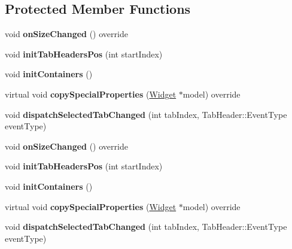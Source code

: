 \subsection*{Protected Member Functions}
\begin{DoxyCompactItemize}
\item 
\mbox{\label{classui_1_1TabControl_af998922d3b0c715156885b983e30d849}} 
void {\bfseries on\+Size\+Changed} () override
\item 
\mbox{\label{classui_1_1TabControl_ae68d330c1f54dd9545c85d870733fd1c}} 
void {\bfseries init\+Tab\+Headers\+Pos} (int start\+Index)
\item 
\mbox{\label{classui_1_1TabControl_ae51bb692cae9c2337769aa39ff79ce7c}} 
void {\bfseries init\+Containers} ()
\item 
\mbox{\label{classui_1_1TabControl_af84a8cc86aa3617d2ec2f47e5204b067}} 
virtual void {\bfseries copy\+Special\+Properties} (\hyperlink{classui_1_1Widget}{Widget} $\ast$model) override
\item 
\mbox{\label{classui_1_1TabControl_a43517b5b9655880d19808f195baf5c04}} 
void {\bfseries dispatch\+Selected\+Tab\+Changed} (int tab\+Index, Tab\+Header\+::\+Event\+Type event\+Type)
\item 
\mbox{\label{classui_1_1TabControl_af998922d3b0c715156885b983e30d849}} 
void {\bfseries on\+Size\+Changed} () override
\item 
\mbox{\label{classui_1_1TabControl_ae68d330c1f54dd9545c85d870733fd1c}} 
void {\bfseries init\+Tab\+Headers\+Pos} (int start\+Index)
\item 
\mbox{\label{classui_1_1TabControl_ae51bb692cae9c2337769aa39ff79ce7c}} 
void {\bfseries init\+Containers} ()
\item 
\mbox{\label{classui_1_1TabControl_a62811fff6dd12957f12a7f9c9577576b}} 
virtual void {\bfseries copy\+Special\+Properties} (\hyperlink{classui_1_1Widget}{Widget} $\ast$model) override
\item 
\mbox{\label{classui_1_1TabControl_a43517b5b9655880d19808f195baf5c04}} 
void {\bfseries dispatch\+Selected\+Tab\+Changed} (int tab\+Index, Tab\+Header\+::\+Event\+Type event\+Type)
\end{DoxyCompactItemize}
